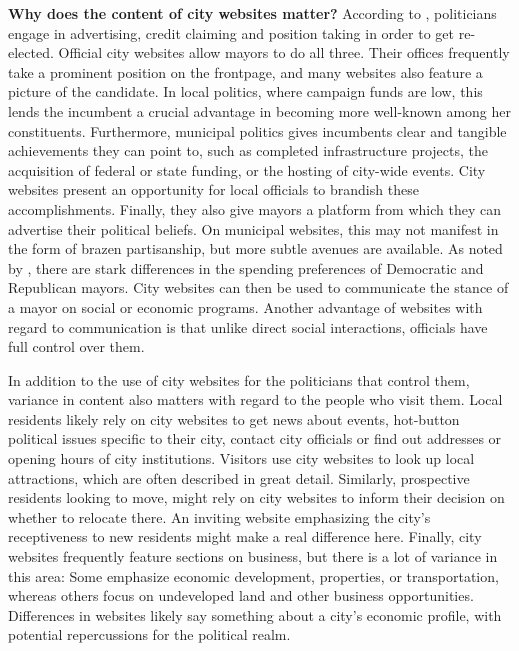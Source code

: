 \documentclass[11pt]{article}
\begin{document}
\textbf{Why does the content of city websites matter?} According to \cite{Mayhew1974}, politicians engage in advertising, credit claiming and position taking in order to get re-elected. Official city websites allow mayors to do all three. Their offices frequently take a prominent position on the frontpage, and many websites also feature a picture of the candidate. In local politics, where campaign funds are low, this lends the incumbent a crucial advantage in becoming more well-known among her constituents. Furthermore, municipal politics gives incumbents clear and tangible achievements they can point to, such as completed infrastructure projects, the acquisition of federal or state funding, or the hosting of city-wide events. City websites present an opportunity for local officials to brandish these accomplishments. Finally, they also give mayors a platform from which they can advertise their political beliefs. On municipal websites, this may not manifest in the form of brazen partisanship, but more subtle avenues are available. As noted by \cite{Einstein2015a}, there are stark differences in the spending preferences of Democratic and Republican mayors. City websites can then be used to communicate the stance of a mayor on social or economic programs. Another advantage of websites with regard to communication is that unlike direct social interactions, officials have full control over them.

In addition to the use of city websites for the politicians that control them, variance in content also matters  with regard to the people who visit them. Local residents likely rely on city websites to get news about events, hot-button political issues specific to their city, contact city officials or find out addresses or opening hours of city institutions. Visitors use city websites to look up local attractions, which are often described in great detail. Similarly, prospective residents looking to move, might rely on city websites to inform their decision on whether to relocate there. An inviting website emphasizing the city's receptiveness to new residents might make a real difference here. Finally, city websites frequently feature sections on business, but there is a lot of variance in this area: Some emphasize economic development, properties, or transportation, whereas others focus on undeveloped land and other business opportunities. Differences in websites likely say something about a city's economic profile, with potential repercussions for the political realm.
\end{document}
